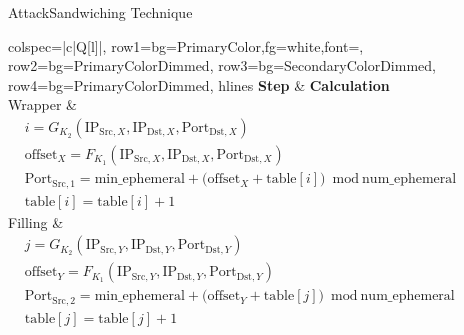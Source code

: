 \documentclass[aspectratio=169, hyperref={colorlinks=true, allcolors=SecondaryColor}, c]{beamer}
\begin{document}
\begin{frame}[fragile]{Attack}{Sandwiching Technique}
	\begin{center}
		\begin{adjustbox}{max height=0.8\textheight, max width=0.8\textwidth}
			\begin{tblr}{
				colspec={|c|Q[l]|},
				row{1}={bg=PrimaryColor,fg=white,font=\bfseries},
				row{2}={bg=PrimaryColorDimmed},
				row{3}={bg=SecondaryColorDimmed},
				row{4}={bg=PrimaryColorDimmed},
				hlines
				}
				\textbf{Step} & \textbf{Calculation} \\

				Wrapper       &
				\(
				\begin{aligned}
					 & i = G_{K_2}(\text{IP}_{\text{Src},X}, \text{IP}_{\text{Dst},X}, \text{Port}_{\text{Dst},X})                                   \\
					 & \text{offset}_X = F_{K_1}(\text{IP}_{\text{Src},X}, \text{IP}_{\text{Dst},X}, \text{Port}_{\text{Dst},X})                     \\
					 & \text{Port}_{\text{Src},1} = \text{min\_ephemeral} + \bigl(\text{offset}_X + \text{table}[i]\bigr)\bmod \text{num\_ephemeral} \\
					 & \text{table}[i] = \text{table}[i] + 1
				\end{aligned}
				\)                                   \\

				Filling       &
				\(
				\begin{aligned}
					 & j = G_{K_2}(\text{IP}_{\text{Src},Y}, \text{IP}_{\text{Dst},Y}, \text{Port}_{\text{Dst},Y})                                   \\
					 & \text{offset}_Y = F_{K_1}(\text{IP}_{\text{Src},Y}, \text{IP}_{\text{Dst},Y}, \text{Port}_{\text{Dst},Y})                     \\
					 & \text{Port}_{\text{Src},2} = \text{min\_ephemeral} + \bigl(\text{offset}_Y + \text{table}[j]\bigr)\bmod \text{num\_ephemeral} \\
					 & \text{table}[j] = \text{table}[j] + 1
				\end{aligned}
				\)                                   \\


\end{tblr}
\end{adjustbox}
\end{center}
\end{frame}
\end{document}
